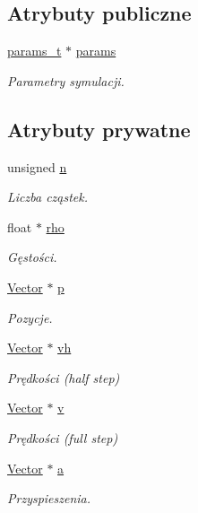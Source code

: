 \subsection*{Atrybuty publiczne}
\begin{DoxyCompactItemize}
\item 
\hyperlink{structparams__t}{params\-\_\-t} $\ast$ \hyperlink{classsimulation_a861b82cc3c0e7e58abfba464a133dae3}{params}
\begin{DoxyCompactList}\small\item\em Parametry symulacji. \end{DoxyCompactList}\end{DoxyCompactItemize}
\subsection*{Atrybuty prywatne}
\begin{DoxyCompactItemize}
\item 
unsigned \hyperlink{classsimulation_a22eb97765a5c60adf3d995f7a110da70}{n}
\begin{DoxyCompactList}\small\item\em Liczba cząstek. \end{DoxyCompactList}\item 
float $\ast$ \hyperlink{classsimulation_a44081d4edd92e17a3e1067b976031a00}{rho}
\begin{DoxyCompactList}\small\item\em Gęstości. \end{DoxyCompactList}\item 
\hyperlink{class_vector}{Vector} $\ast$ \hyperlink{classsimulation_a5412fd01febe99f12ae38e30eb692ff0}{p}
\begin{DoxyCompactList}\small\item\em Pozycje. \end{DoxyCompactList}\item 
\hyperlink{class_vector}{Vector} $\ast$ \hyperlink{classsimulation_ae6da1f15728f49be7b0793700866ede9}{vh}
\begin{DoxyCompactList}\small\item\em Prędkości (half step) \end{DoxyCompactList}\item 
\hyperlink{class_vector}{Vector} $\ast$ \hyperlink{classsimulation_a39dbad79b1b8667840638a35e839a3f7}{v}
\begin{DoxyCompactList}\small\item\em Prędkości (full step) \end{DoxyCompactList}\item 
\hyperlink{class_vector}{Vector} $\ast$ \hyperlink{classsimulation_a7b5ca0e5fc096989be7966a73c360b7f}{a}
\begin{DoxyCompactList}\small\item\em Przyspieszenia. \end{DoxyCompactList}\end{DoxyCompactItemize}
